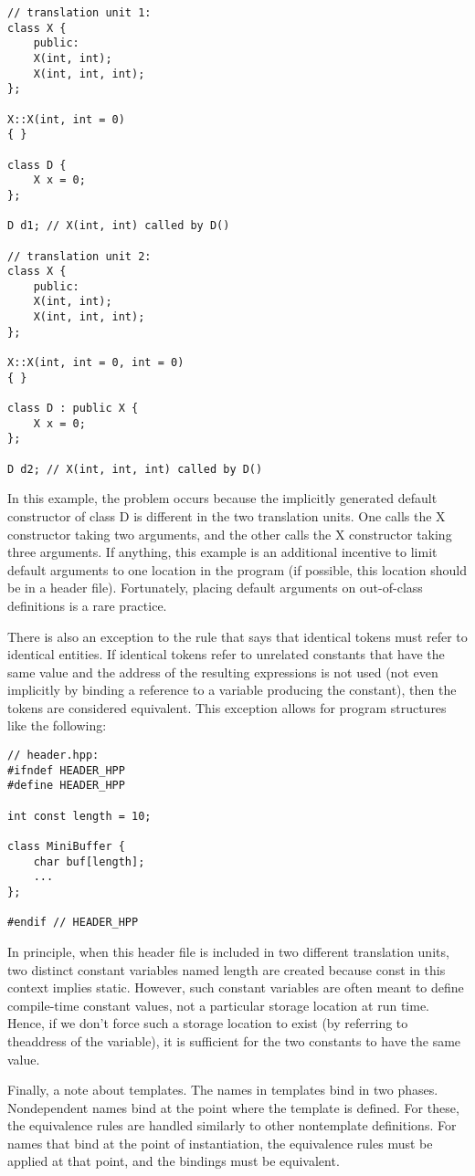 \begin{lstlisting}[style=styleCXX]
// translation unit 1:
class X {
	public:
	X(int, int);
	X(int, int, int);
};

X::X(int, int = 0)
{ }

class D {
	X x = 0;
};

D d1; // X(int, int) called by D()

// translation unit 2:
class X {
	public:
	X(int, int);
	X(int, int, int);
};

X::X(int, int = 0, int = 0)
{ }

class D : public X {
	X x = 0;
};

D d2; // X(int, int, int) called by D()
\end{lstlisting}

In this example, the problem occurs because the implicitly generated default constructor of class D is different in the two translation units. One calls the X constructor taking two arguments, and the other calls the X constructor taking three arguments. If anything, this example is an additional incentive to limit default arguments to one location in the program (if possible, this location should be in a header file). Fortunately, placing default arguments on out-of-class definitions is a rare practice.

There is also an exception to the rule that says that identical tokens must refer to identical entities. If identical tokens refer to unrelated constants that have the same value and the address of the resulting expressions is not used (not even implicitly by binding a reference to a variable producing the constant), then the tokens are considered equivalent. This exception allows for program structures like the following:

\begin{lstlisting}[style=styleCXX]
// header.hpp:
#ifndef HEADER_HPP
#define HEADER_HPP

int const length = 10;

class MiniBuffer {
	char buf[length];
	...
};

#endif // HEADER_HPP
\end{lstlisting}

In principle, when this header file is included in two different translation units, two distinct constant variables named length are created because const in this context implies static. However, such constant variables are often meant to define compile-time constant values, not a particular storage location at run time. Hence, if we don’t force such a storage  location to exist (by referring to theaddress of the variable), it is sufficient for the two constants to have the same value.

Finally, a note about templates. The names in templates bind in two phases. Nondependent names bind at the point where the template is defined. For these, the equivalence rules are handled similarly to other nontemplate definitions. For names that bind at the point of instantiation, the equivalence rules must be applied at that point, and the bindings must be equivalent.





